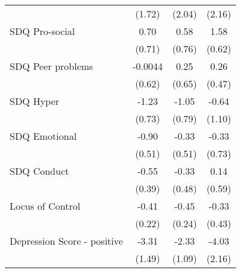 {\begin{tabular}{l*{3}{c}}
            &      (1.72)         &      (2.04)         &      (2.16)         \\
\addlinespace
SDQ Pro-social&        0.70         &        0.58         &        1.58\sym{*}  \\
            &      (0.71)         &      (0.76)         &      (0.62)         \\
\addlinespace
SDQ Peer problems&     -0.0044         &        0.25         &        0.26         \\
            &      (0.62)         &      (0.65)         &      (0.47)         \\
\addlinespace
SDQ Hyper   &       -1.23         &       -1.05         &       -0.64         \\
            &      (0.73)         &      (0.79)         &      (1.10)         \\
\addlinespace
SDQ Emotional&       -0.90         &       -0.33         &       -0.33         \\
            &      (0.51)         &      (0.51)         &      (0.73)         \\
\addlinespace
SDQ Conduct &       -0.55         &       -0.33         &        0.14         \\
            &      (0.39)         &      (0.48)         &      (0.59)         \\
\addlinespace
Locus of Control&       -0.41         &       -0.45         &       -0.33         \\
            &      (0.22)         &      (0.24)         &      (0.43)         \\
\addlinespace
Depression Score - positive&       -3.31\sym{*}  &       -2.33\sym{*}  &       -4.03         \\
            &      (1.49)         &      (1.09)         &      (2.16)         \\
\bottomrule
\end{tabular}
}

